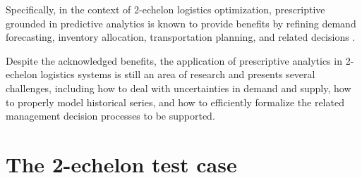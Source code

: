 \documentclass[ijoc,sglanonrev]{informs4}
\begin{document}

Specifically, in the context of 2-echelon logistics optimization, prescriptive grounded in predictive analytics is known to provide benefits by refining demand forecasting, inventory allocation, transportation planning, and related decisions \citep{VAD12,KK10,A01}.

Despite the acknowledged benefits, the application of prescriptive analytics in 2-echelon logistics systems is still an area of research and presents several challenges, including how to deal with uncertainties in demand and supply, how to properly model historical series, and how to efficiently formalize the related management decision processes to be supported. 


\section{The 2-echelon test case} \label{Sec:testcase}
\end{document}
